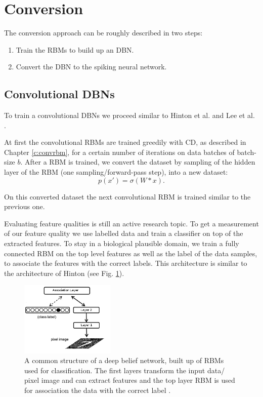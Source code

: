 \section{Conversion} \label{c:convappro}

The conversion approach can be roughly described in two steps:
\begin{enumerate}
\item Train the RBMs to build up an DBN.
\item Convert the DBN to the spiking neural network.
\end{enumerate}


\subsection{Convolutional DBNs} \label{c:convdbns}

To train a convolutional DBNs we proceed similar to Hinton et al. and Lee et al. \cite{hinton2006fast} \cite{lee2009convolutional}.

At first the convolutional RBMs are trained greedily with CD, as described in Chapter \ref{c:convrbm}, for a certain number of iterations on data batches of batch-size $b$.
After a RBM is trained, we convert the dataset by sampling of the hidden layer of the RBM (one sampling/forward-pass step), into a new dataset:
\[
p(x') = \sigma(W * x) .
\]

On this converted dataset the next convolutional RBM is trained similar to the previous one.

Evaluating feature qualities is still an active research topic.
To get a measurement of our feature quality we use labelled data and train a classifier on top of the extracted features.
To stay in a biological plausible domain, we train a fully connected RBM on the top level features as well as the label of the data samples, to associate the features with the correct labels.
This architecture is similar to the architecture of Hinton \cite{hinton2006fast} (see Fig. \ref{fig:dbnmnist}).

\begin{figure}
	\centering
    	\includegraphics[width=0.4\textwidth]{imgs/dbn_mnist.png} 
    \caption[A common structure of a deep belief network.]{A common structure of a deep belief network, built up of RBMs used for classification. The first layers transform the input data/ pixel image and can extract features and the top layer RBM is used for association the data with the correct label \cite{Zorzi2013Modeling}.}
	\label{fig:dbnmnist}
\end{figure}

